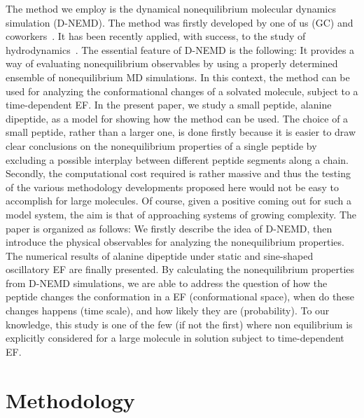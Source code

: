 \documentclass[a4paper,preprint,unsortedaddress,onecolumn]{revtex4-1}
\begin{document}
The method we employ is the dynamical nonequilibrium molecular dynamics simulation (D-NEMD).
The method was firstly developed by one of us (GC) and coworkers~\cite{ciccotti1975direct, ciccotti1979thought}.
It has been recently applied, with success, to the study of
hydrodynamics~\cite{orlandini2011hydrodynamics,
  orlandini2011hydrodynamics-01}. The essential feature of D-NEMD is the following: It provides a way of evaluating
nonequilibrium observables by using a properly determined ensemble of nonequilibrium MD
simulations.  In this context, the method can be used for analyzing the
conformational changes of a solvated molecule, subject to a time-dependent EF.
In the present paper, we study a small peptide, alanine dipeptide, as a model for showing how the method can be used. 
The choice of a small peptide, rather than a larger one, is done firstly because it
is easier to draw clear conclusions on the nonequilibrium properties
of a single peptide by excluding a possible interplay between
different peptide segments along a chain.
Secondly, the computational cost required is rather massive and thus the testing of the various methodology developments proposed here would not be easy to accomplish for large molecules. Of course, given a positive coming out for such a model system, the aim is that of approaching systems of growing complexity.
The paper is organized as follows:
We firstly describe the idea of D-NEMD, then
introduce the physical
observables for analyzing the nonequilibrium properties. The numerical results of alanine
dipeptide under static and sine-shaped oscillatory EF are
finally presented. By calculating the nonequilibrium properties from D-NEMD
simulations, we are able to address the question of how the peptide
changes the conformation in a EF (conformational space), when do these changes happens (time scale),
and how likely they are (probability). 
To our knowledge, this study is one of the few (if not the first)  where non equilibrium is explicitly considered for a large molecule in solution subject to time-dependent EF.



\section{Methodology}
\end{document}
